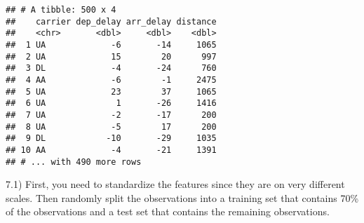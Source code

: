 \documentclass[
  11pt,
]{article}
\newenvironment{Shaded}{\begin{snugshade}}{\end{snugshade}}
\newcommand{\CommentTok}[1]{\textcolor[rgb]{0.56,0.35,0.01}{\textit{#1}}}
\newcommand{\DecValTok}[1]{\textcolor[rgb]{0.00,0.00,0.81}{#1}}
\newcommand{\FloatTok}[1]{\textcolor[rgb]{0.00,0.00,0.81}{#1}}
\newcommand{\FunctionTok}[1]{\textcolor[rgb]{0.00,0.00,0.00}{#1}}
\newcommand{\NormalTok}[1]{#1}
\newcommand{\OtherTok}[1]{\textcolor[rgb]{0.56,0.35,0.01}{#1}}
\newcommand{\SpecialCharTok}[1]{\textcolor[rgb]{0.00,0.00,0.00}{#1}}
\newcommand{\StringTok}[1]{\textcolor[rgb]{0.31,0.60,0.02}{#1}}
\begin{document}
\begin{verbatim}
## # A tibble: 500 x 4
##    carrier dep_delay arr_delay distance
##    <chr>       <dbl>     <dbl>    <dbl>
##  1 UA             -6       -14     1065
##  2 UA             15        20      997
##  3 DL             -4       -24      760
##  4 AA             -6        -1     2475
##  5 UA             23        37     1065
##  6 UA              1       -26     1416
##  7 UA             -2       -17      200
##  8 UA             -5        17      200
##  9 DL            -10       -29     1035
## 10 AA             -4       -21     1391
## # ... with 490 more rows
\end{verbatim}

7.1) First, you need to standardize the features since they are on very
different scales. Then randomly split the observations into a training
set that contains 70\% of the observations and a test set that contains
the remaining observations.

\begin{Shaded}
\end{Shaded}
\end{document}
